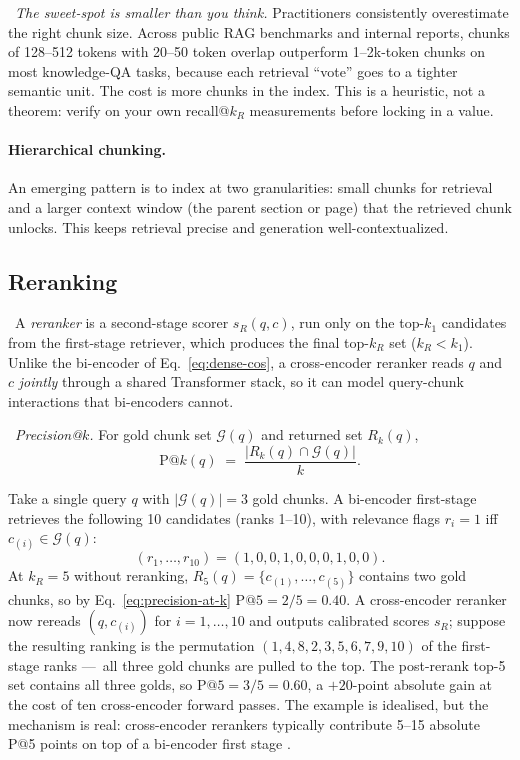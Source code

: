 \Heur\ \emph{The sweet-spot is smaller than you think.}
Practitioners consistently overestimate the right chunk size.
Across public RAG benchmarks and internal reports, chunks of
128--512 tokens with 20--50 token overlap outperform 1--2k-token
chunks on most knowledge-QA tasks, because each retrieval ``vote''
goes to a tighter semantic unit. The cost is more chunks in the
index. This is a heuristic, not a theorem: verify on your own
recall@$k_R$ measurements before locking in a value.

\paragraph{Hierarchical chunking.}
An emerging pattern is to index at two granularities: small chunks
for retrieval and a larger context window (the parent section or
page) that the retrieved chunk unlocks. This keeps retrieval
precise and generation well-contextualized.

\subsection{Reranking}

\Def\ A \emph{reranker} is a second-stage scorer $s_R(q, c)$, run
only on the top-$k_1$ candidates from the first-stage retriever,
which produces the final top-$k_R$ set ($k_R < k_1$). Unlike the
bi-encoder of Eq.~\eqref{eq:dense-cos}, a cross-encoder reranker
reads $q$ and $c$ \emph{jointly} through a shared Transformer
stack, so it can model query-chunk interactions that bi-encoders
cannot.

\Def\ \emph{Precision@$k$.} For gold chunk set $\mathcal{G}(q)$ and
returned set $R_k(q)$,
\begin{equation}
  \mathrm{P@}k(q)
  \;=\; \frac{\bigl|R_k(q) \cap \mathcal{G}(q)\bigr|}{k}.
  \label{eq:precision-at-k}
\end{equation}

\begin{workedexample}
Take a single query $q$ with $|\mathcal{G}(q)| = 3$ gold chunks. A
bi-encoder first-stage retrieves the following 10 candidates (ranks
1--10), with relevance flags $r_i = 1$ iff $c_{(i)} \in \mathcal{G}(q)$:
\[
  (r_1, \dots, r_{10}) = (1, 0, 0, 1, 0, 0, 0, 1, 0, 0).
\]
At $k_R = 5$ without reranking, $R_5(q) = \{c_{(1)}, \dots, c_{(5)}\}$
contains two gold chunks, so by
Eq.~\eqref{eq:precision-at-k} $\mathrm{P@}5 = 2/5 = 0.40$. A
cross-encoder reranker now rereads $(q, c_{(i)})$ for $i = 1, \dots,
10$ and outputs calibrated scores $s_R$; suppose the resulting
ranking is the permutation
$(1, 4, 8, 2, 3, 5, 6, 7, 9, 10)$ of the first-stage ranks
---~all three gold chunks are pulled to the top. The post-rerank
top-5 set contains all three golds, so
$\mathrm{P@}5 = 3/5 = 0.60$, a $+20$-point absolute gain at the
cost of ten cross-encoder forward passes. The example is
idealised, but the mechanism is real: cross-encoder rerankers
typically contribute 5--15 absolute P@5 points on top of a
bi-encoder first stage \citep{nogueira2020monobert}.
\end{workedexample}


